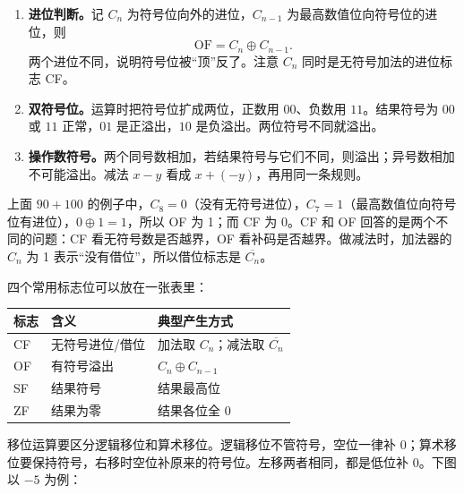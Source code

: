 \begin{enumerate}
  \item \textbf{进位判断。}记 $C_n$ 为符号位向外的进位，$C_{n-1}$ 为最高数值位向符号位的进位，则
  \[
  \text{OF}=C_n\oplus C_{n-1}.
  \]
  两个进位不同，说明符号位被“顶”反了。注意 $C_n$ 同时是无符号加法的进位标志 CF。
  \item \textbf{双符号位。}运算时把符号位扩成两位，正数用 $00$、负数用 $11$。结果符号为 $00$ 或 $11$ 正常，$01$ 是正溢出，$10$ 是负溢出。两位符号不同就溢出。
  \item \textbf{操作数符号。}两个同号数相加，若结果符号与它们不同，则溢出；异号数相加不可能溢出。减法 $x-y$ 看成 $x+(-y)$，再用同一条规则。
\end{enumerate}

上面 $90+100$ 的例子中，$C_8=0$（没有无符号进位），$C_7=1$（最高数值位向符号位有进位），$0\oplus1=1$，所以 OF 为 1；而 CF 为 0。CF 和 OF 回答的是两个不同的问题：CF 看无符号数是否越界，OF 看补码是否越界。做减法时，加法器的 $C_n$ 为 1 表示“没有借位”，所以借位标志是 $\overline{C_n}$。

四个常用标志位可以放在一张表里：

\begin{center}
\begin{tabular}{lll}
\toprule
标志 & 含义 & 典型产生方式 \\
\midrule
CF & 无符号进位/借位 & 加法取 $C_n$；减法取 $\overline{C_n}$ \\
OF & 有符号溢出 & $C_n\oplus C_{n-1}$ \\
SF & 结果符号 & 结果最高位 \\
ZF & 结果为零 & 结果各位全 0 \\
\bottomrule
\end{tabular}
\end{center}

移位运算要区分逻辑移位和算术移位。逻辑移位不管符号，空位一律补 0；算术移位要保持符号，右移时空位补原来的符号位。左移两者相同，都是低位补 0。下图以 $-5$ 为例：


